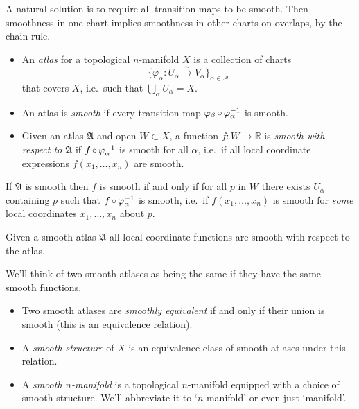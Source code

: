 \documentclass[a4paper,11pt]{article}
\begin{document}
	A natural solution is to require all transition maps to be smooth. Then smoothness in one chart implies smoothness in other charts on overlaps, by the chain rule.

	\begin{defi}
		\begin{itemize}
			\item An \emph{atlas} for a topological $n$-manifold $X$ is a collection of charts \[
				\{\varphi_\alpha: U_\alpha \xrightarrow{\sim} V_\alpha\}_{\alpha\in \mathcal{A}}
			\]
			that covers $X$, i.e.\ such that $\bigcup_{\alpha} U_\alpha = X$.
			\item An atlas is \emph{smooth} if every transition map $\varphi_\beta \operatorname{\circ} \varphi_\alpha^{-1}$ is smooth.
			\item Given an atlas $\mathfrak{A}$ and open $W \subset X$, a function $f: W \to \mathbb{R}$ is \emph{smooth with respect to $\mathfrak{A}$} if $f \operatorname{\circ} \varphi_\alpha^{-1}$ is smooth for all $\alpha$, i.e.\ if all local coordinate expressions $f(x_1,\dots,x_n)$ are smooth.
		\end{itemize}
	\end{defi}

	\begin{lem}
		If $\mathfrak{A}$ is smooth then $f$ is smooth if and only if for all $p$ in $W$ there exists $U_\alpha$ containing $p$ such that $f \operatorname{\circ} \varphi_\alpha^{-1}$ is smooth, i.e.\ if $f(x_1,\dots,x_n)$ is smooth for \emph{some} local coordinates $x_1, \dots,x_n$ about $p$. 
	\end{lem}

	\begin{cor}
		Given a smooth atlas $\mathfrak{A}$ all local coordinate functions are smooth with respect to the atlas.
	\end{cor}

	We'll think of two smooth atlases as being the same if they have the same smooth functions.

	\begin{defi}
		\begin{itemize}
			\item Two smooth atlases are \emph{smoothly equivalent} if and only if their union is smooth (this is an equivalence relation).
			\item A \emph{smooth structure} of $X$ is an equivalence class of smooth atlases under this relation.
			\item A \emph{smooth $n$-manifold} is a topological $n$-manifold equipped with a choice of smooth structure. We'll abbreviate it to `$n$-manifold' or even just `manifold'.
		\end{itemize}
	\end{defi}
\end{document}

